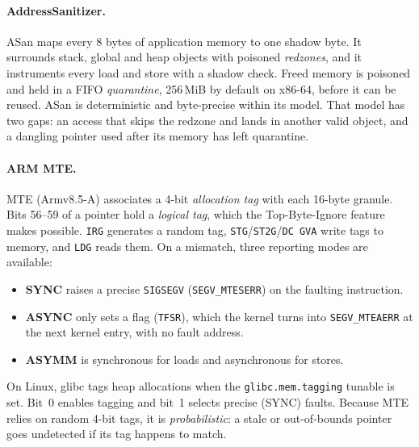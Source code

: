 \documentclass[11pt,a4paper]{article}
\begin{document}
\paragraph{AddressSanitizer.}
ASan maps every 8 bytes of application memory to one shadow byte.
It surrounds stack, global and heap objects with poisoned \emph{redzones}, and it instruments every load and store with a shadow check.
Freed memory is poisoned and held in a FIFO \emph{quarantine}, 256\,MiB by default on x86-64, before it can be reused.
ASan is deterministic and byte-precise within its model.
That model has two gaps: an access that skips the redzone and lands in another valid object, and a dangling pointer used after its memory has left quarantine.

\paragraph{ARM MTE.}
MTE (Armv8.5-A) associates a 4-bit \emph{allocation tag} with each 16-byte granule.
Bits 56--59 of a pointer hold a \emph{logical tag}, which the Top-Byte-Ignore feature makes possible.
\texttt{IRG} generates a random tag, \texttt{STG}/\texttt{ST2G}/\texttt{DC GVA} write tags to memory, and \texttt{LDG} reads them.
On a mismatch, three reporting modes are available:
\begin{itemize}[itemsep=1pt]
\item \textbf{SYNC} raises a precise \texttt{SIGSEGV} (\texttt{SEGV\_MTESERR}) on the faulting instruction.
\item \textbf{ASYNC} only sets a flag (\texttt{TFSR}), which the kernel turns into \texttt{SEGV\_MTEAERR} at the next kernel entry, with no fault address.
\item \textbf{ASYMM} is synchronous for loads and asynchronous for stores.
\end{itemize}
On Linux, glibc tags heap allocations when the \texttt{glibc.mem.tagging} tunable is set.
Bit~0 enables tagging and bit~1 selects precise (SYNC) faults.
Because MTE relies on random 4-bit tags, it is \emph{probabilistic}: a stale or out-of-bounds pointer goes undetected if its tag happens to match.
\end{document}
